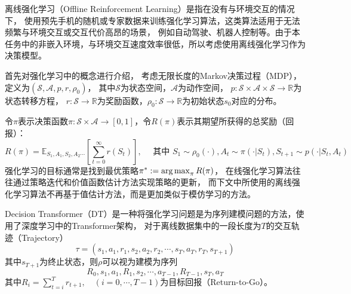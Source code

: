 
\label{sec-offline-rl}
离线强化学习（Offline Reinforcement Learning）是指在没有与环境交互的情况下，
使用预先手机的随机或专家数据来训练强化学习算法，这类算法适用于无法频繁与环境交互或交互代价高昂的场景，
例如自动驾驶、机器人控制等。由于本任务中的非嵌入环境，与环境交互速度效率很低，所以考虑使用离线强化学习作为决策模型。

首先对强化学习中的概念进行介绍，
考虑无限长度的Markov决策过程（MDP），定义为$(\mathcal{S},\mathcal{A},p,r,\rho_0)$，
其中$\mathcal{S}$为状态空间，$\mathcal{A}$为动作空间，
$p:\mathcal{S}\times \mathcal{A}\times \mathcal{S}\to \mathbb{R}$为状态转移方程，
$r:\mathcal{S}\to \mathbb{R}$为奖励函数，$\rho_0:\mathcal{S}\to \mathbb{R}$为初始状态$s_0$对应的分布。

令$\pi$表示决策函数$\pi: \mathcal{S}\times \mathcal{A}\to [0,1]$，令$R(\pi)$表示其期望所获得的总奖励（回报）：
\begin{equation}
  R(\pi) = \mathbb{E}_{S_1,A_1,S_2,A_2\cdots}\left[\sum_{t=0}^{\infty}r(S_t)\right],\quad
  \text{~其中~}S_1\sim\rho_0(\cdot),A_t\sim\pi(\cdot|S_t),S_{t+1}\sim p(\cdot|S_t,A_t)
\end{equation}
强化学习的目标通常是找到最优策略$\pi^* := \operatorname*{arg\,max}_{\pi}R(\pi)$，
在线强化学习算法往往通过策略迭代和价值函数估计方法实现策略的更新，
而下文中所使用的离线强化学习算法不再基于值估计方法，而是更加类似于模仿学习的方法。

Decision Transformer（DT）是一种将强化学习问题是为序列建模问题的方法，使用了深度学习中的Transformer架构，
对于离线数据集中的一段长度为$T$的交互轨迹（Trajectory）
\begin{equation}
  \tau = (s_1,a_1,r_1,s_2,a_2,r_2,\cdots,s_T,a_T,r_T,s_{T+1})
\end{equation}
其中$s_{T+1}$为终止状态，则$\rho$可以视为建模为序列
\begin{equation}\label{eq-sequence}
  R_0,s_1,a_1,R_1,s_2,\cdots,a_{T-1},R_{T-1},s_{T},a_{T}
\end{equation}
其中$R_i=\sum_{t=i}^Tr_{t+1}, \quad(i=0,\cdots,T-1)$为目标回报（Return-to-Go）。

